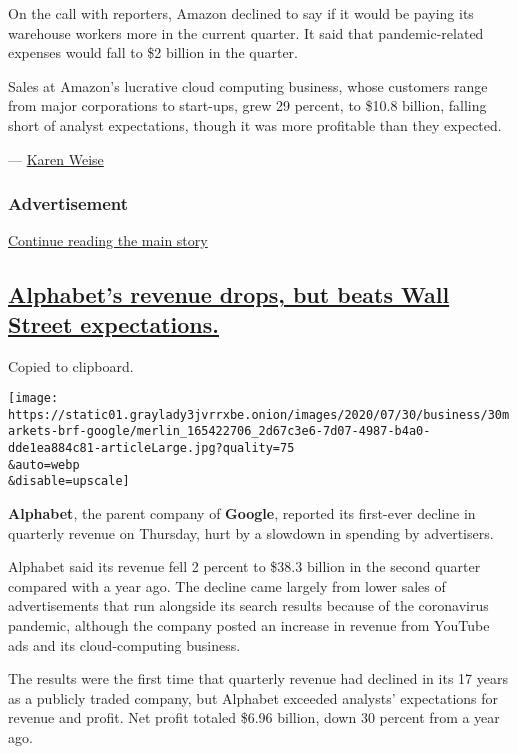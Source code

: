 On the call with reporters, Amazon declined to say if it would be paying
its warehouse workers more in the current quarter. It said that
pandemic-related expenses would fall to \$2 billion in the quarter.

Sales at Amazon's lucrative cloud computing business, whose customers
range from major corporations to start-ups, grew 29 percent, to \$10.8
billion, falling short of analyst expectations, though it was more
profitable than they expected.

--- \href{https://www.nytimes3xbfgragh.onion/by/karen-weise}{Karen
Weise}

\hypertarget{advertisement}{%
\subsubsection{Advertisement}\label{advertisement}}

\protect\hyperlink{after-dfp-ad-mid1}{Continue reading the main story}

\hypertarget{alphabets-revenue-drops-but-beats-wall-street-expectations}{%
\subsection{\texorpdfstring{\protect\hyperlink{alphabets-revenue-drops-but-beats-wall-street-expectations}{Alphabet's
revenue drops, but beats Wall Street
expectations.}}{Alphabet's revenue drops, but beats Wall Street expectations.}}\label{alphabets-revenue-drops-but-beats-wall-street-expectations}}

Copied to clipboard.

\texttt{[image: https://static01.graylady3jvrrxbe.onion/images/2020/07/30/business/30markets-brf-google/merlin\_165422706\_2d67c3e6-7d07-4987-b4a0-dde1ea884c81-articleLarge.jpg?quality=75\\\&auto=webp\\\&disable=upscale]}

\textbf{Alphabet}, the parent company of \textbf{Google}, reported its
first-ever decline in quarterly revenue on Thursday, hurt by a slowdown
in spending by advertisers.

Alphabet said its revenue fell 2 percent to \$38.3 billion in the second
quarter compared with a year ago. The decline came largely from lower
sales of advertisements that run alongside its search results because of
the coronavirus pandemic, although the company posted an increase in
revenue from YouTube ads and its cloud-computing business.

The results were the first time that quarterly revenue had declined in
its 17 years as a publicly traded company, but Alphabet exceeded
analysts' expectations for revenue and profit. Net profit totaled \$6.96
billion, down 30 percent from a year ago.

